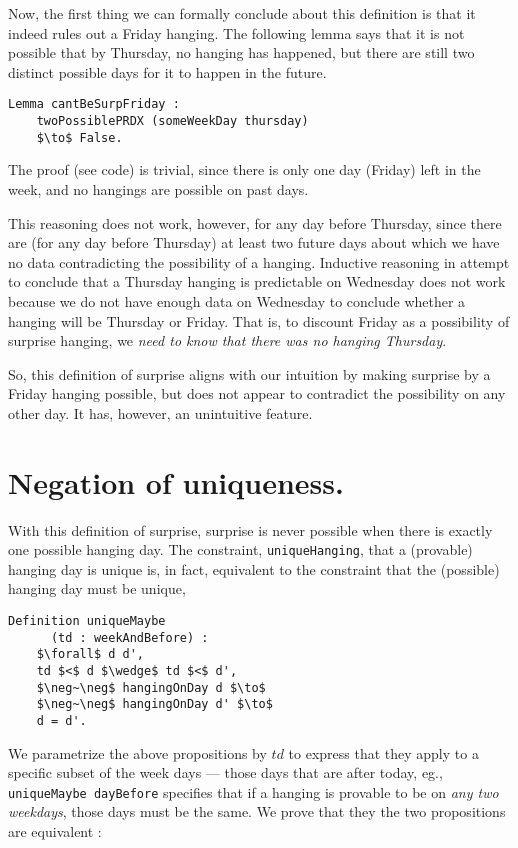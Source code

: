 \documentclass[journal]{journal}
\begin{document}
Now, the first thing we can formally conclude about this definition is that it indeed rules out
a Friday hanging. The following lemma says that it is not possible that by Thursday,
no hanging has happened, but there are still two distinct possible days for it to
happen in the future.

\begin{lstlisting}[mathescape=true]
  Lemma cantBeSurpFriday :
    twoPossiblePRDX (someWeekDay thursday)
    $\to$ False.
\end{lstlisting}

The proof (see code) is trivial, since there is only one day (Friday) left in the week,
and no hangings are possible on past days.

This reasoning does not work, however, for any
day before Thursday, since there are (for any day before Thursday) at least two future
days about which we have no
data contradicting the possibility of a hanging.
Inductive reasoning in attempt to conclude that a Thursday hanging is
predictable on Wednesday does not work because we do not have enough data on Wednesday
to conclude whether a hanging will be Thursday or Friday. That is, to discount Friday
as a possibility of surprise hanging, we \emph{need to know that there was no
hanging Thursday}.

So, this definition of surprise aligns with our intuition by making surprise
by a Friday hanging possible, but does not appear to contradict the possibility
on any other day. It has, however, an unintuitive feature.

\section{Negation of uniqueness. }
\label{sec:unique}

With this definition of surprise, surprise is never possible when there is
exactly one possible hanging day. The constraint, {\tt uniqueHanging}, that
a (provable) hanging day is unique is, in fact, equivalent to the constraint
that the (possible) hanging day must be unique,

\begin{lstlisting}[mathescape=true]
  Definition uniqueMaybe
      (td : weekAndBefore) :
    $\forall$ d d',
    td $<$ d $\wedge$ td $<$ d',
    $\neg~\neg$ hangingOnDay d $\to$
    $\neg~\neg$ hangingOnDay d' $\to$
    d = d'.
\end{lstlisting}

We parametrize the above propositions by $td$ to express that they apply to
a specific subset of the week days --- those days that are after today,
eg., {\tt uniqueMaybe dayBefore} specifies that if a hanging is provable to be
on \emph{any two weekdays}, those days must be the same.
We prove that they the two propositions are equivalent :
\end{document}
